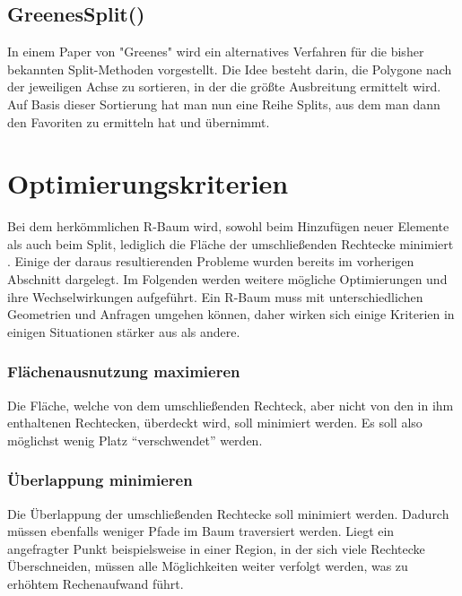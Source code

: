 \documentclass[runningheads,a4paper]{llncs}
\begin{document}
{\subsection{GreenesSplit()}
In einem Paper von "Greenes" wird ein alternatives Verfahren für die bisher bekannten Split-Methoden vorgestellt. Die Idee besteht darin, die Polygone nach der jeweiligen Achse zu sortieren, in der die größte Ausbreitung ermittelt wird. Auf Basis dieser Sortierung hat man nun eine Reihe Splits, aus dem man dann den Favoriten zu ermitteln hat und übernimmt.


\section{Optimierungskriterien} %
\label{sec:optimierungskriterien}

	Bei dem herkömmlichen R-Baum wird, sowohl beim Hinzufügen neuer Elemente als auch beim Split, lediglich die Fläche der umschließenden Rechtecke minimiert \citep[vgl.][50-51]{Guttman:1984}. Einige der daraus resultierenden Probleme wurden bereits im vorherigen Abschnitt dargelegt.
	Im Folgenden werden weitere mögliche Optimierungen und ihre Wechselwirkungen aufgeführt. Ein R-Baum muss mit unterschiedlichen Geometrien und Anfragen umgehen können, daher wirken sich einige Kriterien in einigen Situationen stärker aus als andere.

	\subsubsection{Flächenausnutzung maximieren} %
	\label{ssub:flaechenausnutzung}

	Die Fläche, welche von dem umschließenden Rechteck, aber nicht von den in ihm enthaltenen Rechtecken, überdeckt wird, soll minimiert werden. Es soll also möglichst wenig Platz \enquote{verschwendet} werden. \citep[vgl.][323]{Beckmann:1990}


	\subsubsection{Überlappung minimieren} %
	\label{ssub:ueberlappung_minimieren}

	Die Überlappung der umschließenden Rechtecke soll minimiert werden. Dadurch müssen ebenfalls weniger Pfade im Baum traversiert werden. Liegt ein angefragter Punkt beispielsweise in einer Region, in der sich viele Rechtecke Überschneiden, müssen alle Möglichkeiten weiter verfolgt werden, was zu erhöhtem Rechenaufwand führt.
	
}
\end{document}
